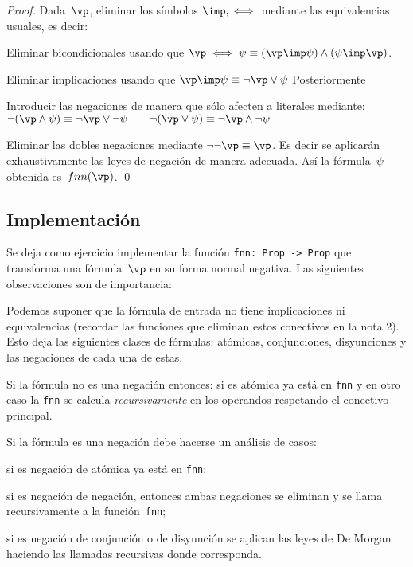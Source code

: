 \documentclass[11pt,letterpaper]{article}
\begin{document}
\begin{proof}
Dada~$\vp$, eliminar los símbolos $\imp,\iff$ mediante las equivalencias 
usuales, es decir:
\bi
 \item Eliminar bicondicionales usando que 
  $\vp\iff\psi \equiv (\vp\imp\psi)\land(\psi\imp\vp)$.
 \item Eliminar implicaciones usando que 
  $\vp\imp\psi \equiv \lnot\vp\lor\psi$
\ei
Posteriormente 
\bi
 \item Introducir las negaciones de manera que s\'olo afecten a literales 
  mediante: \\
  $\lnot(\vp\land\psi)\equiv\lnot\vp\lor\lnot\psi \qquad 
  \lnot(\vp\lor\psi)\equiv\lnot\vp\land\lnot\psi$
 \item Eliminar las dobles negaciones mediante 
  $\lnot\lnot\vp\equiv\vp$.
\ei
Es decir se aplicarán exhaustivamente las leyes de negaci\'on de 
manera adecuada. Así la f\'ormula~$\psi$ obtenida es~$fnn(\vp)$.
\qed
\end{proof}


\subsection{Implementación}

Se deja como ejercicio implementar la función \verb=fnn: Prop -> Prop= que 
transforma una fórmula~$\vp$ en su forma normal negativa. 
Las siguientes observaciones son de importancia:
\be
 \item Podemos suponer que la fórmula de entrada no tiene implicaciones ni 
  equivalencias (recordar las funciones que eliminan estos conectivos en la 
  nota 2). 
  Esto deja las siguientes clases de fórmulas: atómicas, conjunciones, 
  disyunciones y las negaciones de cada una de estas.
 \item Si la fórmula no es una negación entonces: si es atómica ya está en 
  \verb'fnn' y en otro caso la \verb'fnn' se calcula \textit{recursivamente} en 
  los operandos respetando el conectivo principal.
 \item Si la fórmula es una negación debe hacerse un análisis de casos: 
  \be 
   \item si es negación de atómica ya está en \verb'fnn'; 
   \item si es negación de negación, entonces ambas negaciones se eliminan y se 
    llama recursivamente a la función~\verb'fnn'; 
   \item si es negación de conjunción o de disyunción se aplican las leyes de 
    De Morgan haciendo las llamadas recursivas donde corresponda.
  \ee
\ee
\end{document}
